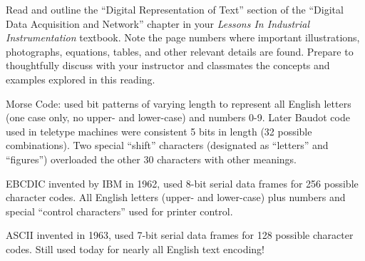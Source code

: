 

Read and outline the ``Digital Representation of Text'' section of the ``Digital Data Acquisition and Network'' chapter in your {\it Lessons In Industrial Instrumentation} textbook.  Note the page numbers where important illustrations, photographs, equations, tables, and other relevant details are found.  Prepare to thoughtfully discuss with your instructor and classmates the concepts and examples explored in this reading.














Morse Code: used bit patterns of varying length to represent all English letters (one case only, no upper- and lower-case) and numbers 0-9.  Later Baudot code used in teletype machines were consistent 5 bits in length (32 possible combinations).  Two special ``shift'' characters (designated as ``letters'' and ``figures'') overloaded the other 30 characters with other meanings.

\vskip 10pt

EBCDIC invented by IBM in 1962, used 8-bit serial data frames for 256 possible character codes.  All English letters (upper- and lower-case) plus numbers and special ``control characters'' used for printer control.

\vskip 10pt

ASCII invented in 1963, used 7-bit serial data frames for 128 possible character codes.  Still used today for nearly all English text encoding!


